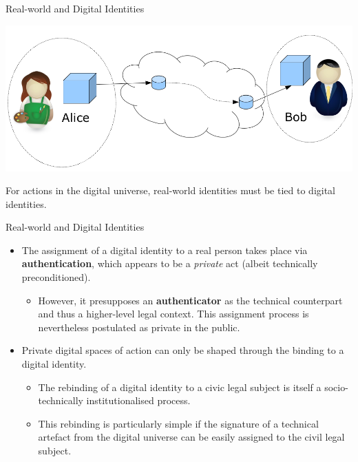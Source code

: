 \documentclass{beamer}
\begin{document}
\begin{frame}{Real-world and Digital Identities}
  \begin{center}
    \includegraphics[width=.9\textwidth]{Bilder/DI-4.png}
  \end{center}
  For actions in the digital universe, real-world identities must be tied to
  digital identities.
\end{frame}
\begin{frame}{Real-world and Digital Identities}
\begin{itemize}
\item The assignment of a digital identity to a real person takes place via
  \textbf{authentication}, which appears to be a \emph{private} act (albeit
  technically preconditioned).
  \begin{itemize}
  \item However, it presupposes an \textbf{authenticator} as the technical
    counterpart and thus a higher-level legal context. This assignment process
    is nevertheless postulated as private in the public.
  \end{itemize}
\item Private digital spaces of action can only be shaped through the
  binding to a digital identity.
  \begin{itemize}
  \item The rebinding of a digital identity to a civic legal subject is itself
    a socio-technically institutionalised process.
  \item This rebinding is particularly simple if the signature of a technical
    artefact from the digital universe can be easily assigned to the civil
    legal subject.
  \end{itemize}
\end{itemize}
\end{frame}
\end{document}
